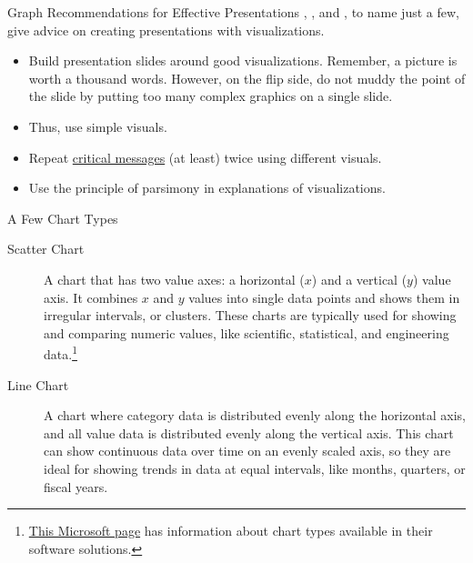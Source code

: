 \documentclass[pdf]{beamer}
\theoremstyle{remark}
\theoremstyle{definition}
\begin{document}
\begin{frame}[t]{Graph Recommendations for Effective Presentations}
\cite{anderson2013}, \cite{lortie2017}, and \cite{naegle2021}, to name just a few, give advice on creating presentations with visualizations. \\
\vspace{1.5ex}
\begin{itemize}
\item  Build presentation slides around good visualizations. Remember, a picture is worth a thousand words. However, on the flip side, do not muddy the point of the slide by putting too many complex graphics on a single slide. 
\item Thus, use simple visuals.
\item Repeat \underline{critical messages} (at least) twice using different visuals.
\item Use the principle of parsimony in explanations of visualizations.
\end{itemize}
\end{frame}

\begin{frame}[t]{A Few Chart Types}
\begin{description}
\item [Scatter Chart] A chart that has two value axes: a horizontal ($x$) and a vertical ($y$) value axis. It combines $x$ and $y$ values into single data points and shows them in irregular intervals, or clusters. These charts are typically used for showing and comparing numeric values, like scientific, statistical, and engineering data.\footnote{\href{https://support.microsoft.com/en-us/office/available-chart-types-in-office-a6187218-807e-4103-9e0a-27cdb19afb90}{This Microsoft page} has information about chart types available in their software solutions.}
\item [Line Chart] A chart where category data is distributed evenly along the horizontal axis, and all value data is distributed evenly along the vertical axis. This chart can show continuous data over time on an evenly scaled axis, so they are ideal for showing trends in data at equal intervals, like months, quarters, or fiscal years.
\end{description}
\end{frame}
\end{document}
